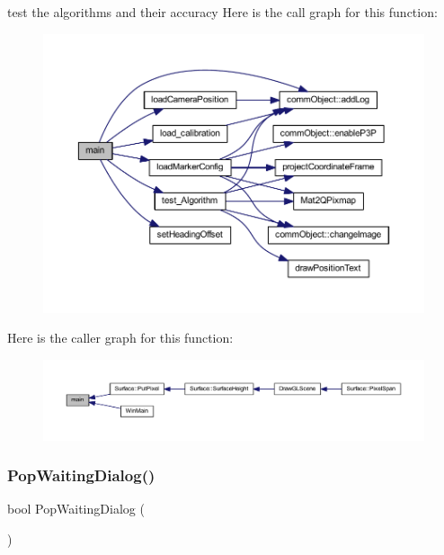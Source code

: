 test the algorithms and their accuracy Here is the call graph for this function\+:\nopagebreak
\begin{figure}[H]
\begin{center}
\leavevmode
\includegraphics[width=350pt]{supportcode_8cpp_a0ddf1224851353fc92bfbff6f499fa97_cgraph}
\end{center}
\end{figure}
Here is the caller graph for this function\+:\nopagebreak
\begin{figure}[H]
\begin{center}
\leavevmode
\includegraphics[width=350pt]{supportcode_8cpp_a0ddf1224851353fc92bfbff6f499fa97_icgraph}
\end{center}
\end{figure}
\mbox{\label{supportcode_8cpp_a23a9dac9e61c325f69b12b1b92b7d1f9}} 
\subsubsection{Pop\+Waiting\+Dialog()}
{\footnotesize\ttfamily bool Pop\+Waiting\+Dialog (\begin{DoxyParamCaption}{ }\end{DoxyParamCaption})}

